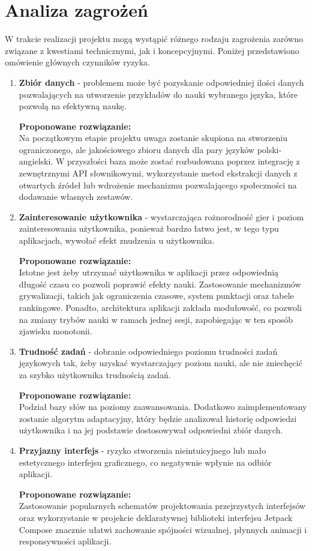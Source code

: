 \documentclass[polish]{aghengthesis}
\begin{document}
\section{Analiza zagrożeń}
W trakcie realizacji projektu mogą wystąpić różnego rodzaju zagrożenia zarówno
związane z kwestiami technicznymi, jak i koncepcyjnymi. Poniżej przedstawiono
omówienie głównych czynników ryzyka.
\begin{enumerate}
    \item \textbf{Zbiór danych} - problemem może być pozyskanie odpowiedniej ilości
    danych pozwalających na utworzenie przykładów do nauki wybranego języka, które
    pozwolą na efektywną naukę.

    \textbf{Proponowane rozwiązanie:} \\
    Na początkowym etapie projektu uwaga zostanie skupiona na stworzeniu
    ograniczonego, ale jakościowego zbioru danych dla pary języków
    polski-angielski. W przyszłości baza może zostać rozbudowana poprzez
    integrację z zewnętrznymi API słownikowymi, wykorzystanie metod ekstrakcji
    danych z otwartych źródeł lub wdrożenie mechanizmu pozwalającego społeczności
    na dodawanie własnych zestawów.
    \item \textbf{Zainteresowanie użytkownika} - wystarczająca rożnorodność gier
    i poziom zainteresowania użytkownika, ponieważ bardzo łatwo jest, w tego typu
    aplikacjach, wywołać efekt znudzenia u użytkownika.
    
    \textbf{Proponowane rozwiązanie:} \\
    Istotne jest żeby utrzymać użytkownika w aplikacji przez odpowiednią długość
    czasu co pozwoli poprawić efekty nauki. Zastosowanie mechanizmów
    grywalizacji, takich jak ograniczenia czasowe, system punktacji oraz tabele
    rankingowe. Ponadto, architektura aplikacji zakłada modułowość, co pozwoli na
    zmiany trybów nauki w ramach jednej sesji, zapobiegając w ten sposób zjawisku
    monotonii.
    \item \textbf{Trudność zadań} - dobranie odpowiedniego poziomu trudności zadań
    językowych tak, żeby uzyskać wystarczający poziom nauki, ale nie zniechęcić za
    szybko użytkownika trudnością zadań.

    \textbf{Proponowane rozwiązanie:} \\
    Podział bazy słów na poziomy zaawansowania. Dodatkowo zaimplementowany
    zostanie algorytm adaptacyjny, który będzie analizował historię odpowiedzi
    użytkownika i na jej podstawie dostosowywał odpowiedni zbiór danych.
    \item \textbf{Przyjazny interfejs} - ryzyko stworzenia nieintuicyjnego lub
    mało estetycznego interfejsu graficznego, co negatywnie wpłynie na odbiór
    aplikacji.

    \textbf{Proponowane rozwiązanie:} \\
    Zastosowanie popularnych schematów projektowania przejrzystych interfejsów
    oraz wykorzystanie w projekcie deklaratywnej biblioteki interfejsu Jetpack
    Compose znacznie ułatwi zachowanie spójności wizualnej, płynnych animacji
    i responsywności aplikacji.
\end{enumerate}
\end{document}
